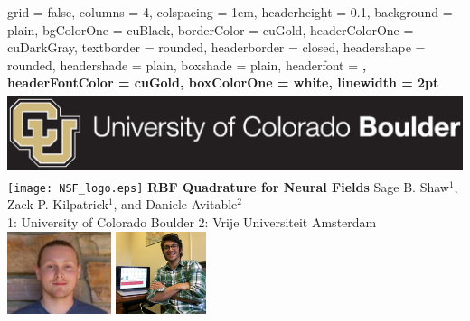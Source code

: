 \documentclass[paperwidth=40in,paperheight=32in,landscape]{baposter} %
\newcommand{\headshotsize}{0.95in}
\begin{document}

\begin{poster}{
	grid = false, %
	columns = 4, %
	colspacing = 1em,
	headerheight = 0.1\textheight,
	background = plain,
	bgColorOne = cuBlack,
	borderColor = cuGold,
	headerColorOne = cuDarkGray,
	textborder = rounded,
	headerborder = closed,
	headershape = rounded,
	headershade = plain,
	boxshade = plain,
	headerfont = \Large\sf\bf,
	headerFontColor = cuGold,
	boxColorOne = white,
	linewidth = 2pt
}
{
\includegraphics[height=\headshotsize, trim={0.5cm, 1cm, 16.4cm, 0.7cm}, clip=true]{cu_logo}
\hspace{.5cm}
\texttt{[image: NSF\_logo.eps]}
}
{\sf\bf
	\color{cuGold}
	RBF Quadrature for Neural Fields
}
{
	\color{cuGold}
	Sage B. Shaw$^{1}$, Zack P. Kilpatrick$^1$, and Daniele Avitable$^2$\\
	\small{1: University of Colorado Boulder}
	\small{2: Vrije Universiteit Amsterdam}
}
{
\includegraphics[height=\headshotsize, trim={3cm, 0cm, 3cm, 0cm}, clip=true]{headshot_sage}
\hspace{.5cm}
\includegraphics[height=\headshotsize, trim={5.1cm, 6cm, 2cm, 0cm}, clip=true]{headshot_zack}
}
\end{poster}
\end{document}
